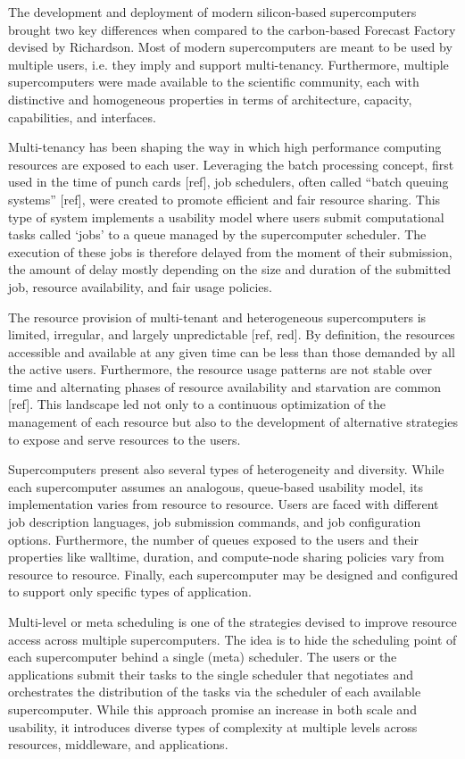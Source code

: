 \documentclass{sig-alternate}
\begin{document}
The development and deployment of modern silicon-based supercomputers brought
two key differences when compared to the carbon-based Forecast Factory devised
by Richardson. Most of modern supercomputers are meant to be used by multiple
users, i.e. they imply and support multi-tenancy. Furthermore, multiple
supercomputers were made available to the scientific community, each with
distinctive and homogeneous properties in terms of architecture, capacity,
capabilities, and interfaces.

Multi-tenancy has been shaping the way in which high performance computing
resources are exposed to each user. Leveraging the batch processing concept,
first used in the time of punch cards [ref], job schedulers, often called
``batch queuing systems'' [ref], were created to promote efficient and fair
resource sharing. This type of system implements a usability model where users
submit computational tasks called `jobs' to a queue managed by the
supercomputer scheduler. The execution of these jobs is therefore delayed from
the moment of their submission, the amount of delay mostly depending on the
size and duration of the submitted job, resource availability, and fair usage
policies.

The resource provision of multi-tenant and heterogeneous supercomputers is
limited, irregular, and largely unpredictable [ref, red]. By definition, the
resources accessible and available at any given time can be less than those
demanded by all the active users. Furthermore, the resource usage patterns are
not stable over time and alternating phases of resource availability and
starvation are common [ref]. This landscape led not only to a continuous
optimization of the management of each resource but also to the development of
alternative strategies to expose and serve resources to the users.

Supercomputers present also several types of heterogeneity and diversity. While
each supercomputer assumes an analogous, queue-based usability model, its
implementation varies from resource to resource. Users are faced with different
job description languages, job submission commands, and job configuration
options. Furthermore,  the number of queues exposed to the users and their
properties like walltime, duration, and compute-node sharing policies vary from
resource to resource. Finally, each supercomputer may be designed and
configured to support only specific types of application.

Multi-level or meta scheduling is one of the strategies devised to improve
resource access across multiple supercomputers. The idea is to hide the
scheduling point of each supercomputer behind a single (meta) scheduler. The
users or the applications submit their tasks to the single scheduler that
negotiates and orchestrates the distribution of the tasks via the scheduler of
each available supercomputer. While this approach promise an increase in both
scale and usability, it introduces diverse types of complexity at multiple
levels across resources, middleware, and applications.
\end{document}
